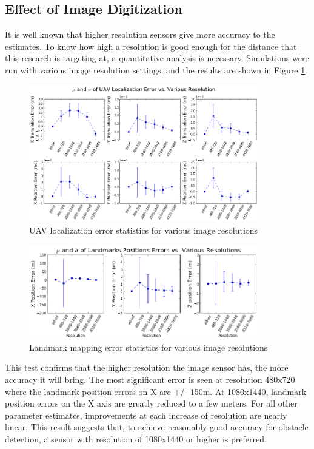 \subsection{Effect of Image Digitization}

It is well known that higher resolution sensors give more accuracy
to the estimates. To know how high a resolution is good enough for the
distance that this research is targeting at, a quantitative
analysis is necessary. Simulations were run with various image
resolution settings, and the results are shown in Figure
\ref{fig:simfig50}.
\begin{figure}[h] 
  \centering
  \includegraphics[width=10cm,keepaspectratio=true]{./Figures/SimulationFigures/Figure50.png}
  \caption{UAV localization error statistics for various image resolutions}
  \label{fig:simfig50}
\end{figure}

\begin{figure}[h] 
  \centering
  \includegraphics[width=10cm,keepaspectratio=true]{./Figures/SimulationFigures/Figure49.png}
  \caption{Landmark mapping error statistics for various image resolutions}
  \label{fig:simfig51}
\end{figure}

This test confirms that the higher resolution the image sensor has,
the more accuracy it will bring. The most significant error is seen
at resolution 480x720 where the landmark position errors on X are
+/- 150m. At 1080x1440, landmark position errors on the X axis are
greatly reduced to a few meters. For all other parameter estimates,
improvements at each increase of resolution are nearly linear.
This result suggests that, to achieve reasonably good accuracy for
obstacle detection, a sensor with resolution of 1080x1440 or higher is
preferred.


